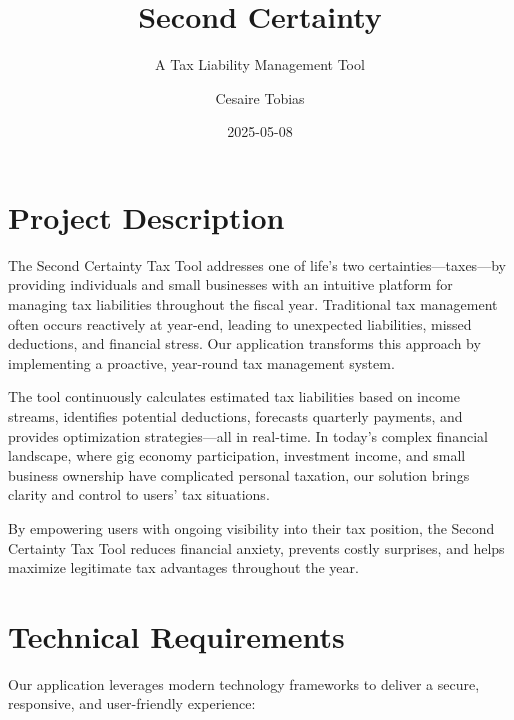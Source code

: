 \documentclass[
  11pt,
  letterpaper,
]{article}
\title{Second Certainty}
\subtitle{A Tax Liability Management Tool}
\author{Cesaire Tobias}
\date{2025-05-08}
\renewcommand*\contentsname{Table of contents}
\newcommand\contentsname{Table of contents}
\begin{document}
\maketitle
\ifdefined\Shaded\renewenvironment{Shaded}{\begin{tcolorbox}[breakable, interior hidden, sharp corners, boxrule=0pt, frame hidden, enhanced, borderline west={3pt}{0pt}{shadecolor}]}{\end{tcolorbox}}\fi

\renewcommand*\contentsname{Table of contents}
{
\hypersetup{linkcolor=}
\setcounter{tocdepth}{3}
\tableofcontents
}
\hypertarget{project-description}{%
\section{Project Description}\label{project-description}}

The Second Certainty Tax Tool addresses one of life's two
certainties---taxes---by providing individuals and small businesses with
an intuitive platform for managing tax liabilities throughout the fiscal
year. Traditional tax management often occurs reactively at year-end,
leading to unexpected liabilities, missed deductions, and financial
stress. Our application transforms this approach by implementing a
proactive, year-round tax management system.

The tool continuously calculates estimated tax liabilities based on
income streams, identifies potential deductions, forecasts quarterly
payments, and provides optimization strategies---all in real-time. In
today's complex financial landscape, where gig economy participation,
investment income, and small business ownership have complicated
personal taxation, our solution brings clarity and control to users' tax
situations.

By empowering users with ongoing visibility into their tax position, the
Second Certainty Tax Tool reduces financial anxiety, prevents costly
surprises, and helps maximize legitimate tax advantages throughout the
year.

\hypertarget{technical-requirements}{%
\section{Technical Requirements}\label{technical-requirements}}

Our application leverages modern technology frameworks to deliver a
secure, responsive, and user-friendly experience:
\end{document}
